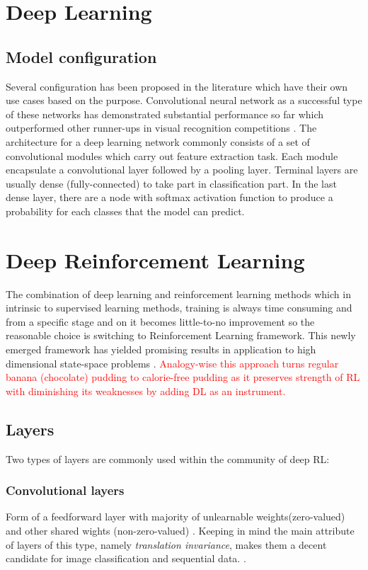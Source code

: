 \documentclass[letterpaper,12pt]{article}
\begin{document}
    \section{Deep Learning}
    \subsection{Model configuration}
    Several configuration has been proposed in the literature which have their own use cases based on the purpose. Convolutional neural network as a successful type of these networks has demonstrated substantial performance so far which outperformed other runner-ups in visual recognition competitions \cite{lecun1998gradient, krizhevsky2012a, zeiler2013, szegedy2014going, he2016a}. The architecture for a deep learning network commonly consists of a set of convolutional modules which carry out feature extraction task. Each module encapsulate a convolutional layer followed by a pooling layer. Terminal layers are usually dense (fully-connected) to take part in classification part. In the last dense layer, there are a node with softmax activation function to produce a probability for each classes that the model can predict.

    \section{Deep Reinforcement Learning}
    The combination of deep learning and reinforcement learning methods which in intrinsic to supervised learning methods, training is always time consuming and from a specific stage and on it becomes little-to-no improvement so the reasonable choice is switching to Reinforcement Learning framework. This newly emerged framework has yielded promising results in application to high dimensional state-space problems \cite{Francois-Lavet2018}. \textcolor{red}{ Analogy-wise this approach turns regular banana (chocolate) pudding to calorie-free pudding as it preserves strength of RL with diminishing its weaknesses by adding DL as an instrument.}

    \subsection{Layers}
    Two types of layers are commonly used within the community of deep RL:

    \subsubsection{Convolutional layers}
    Form of a feedforward layer with majority of unlearnable weights(zero-valued) and other shared wights (non-zero-valued) \cite{Francois-Lavet2018}. Keeping in mind the main attribute of layers of this type, namely \textit{translation invariance}, makes them a decent candidate for image classification and sequential data. \cite{lecun1995a, Francois-Lavet2018}.
\end{document}
